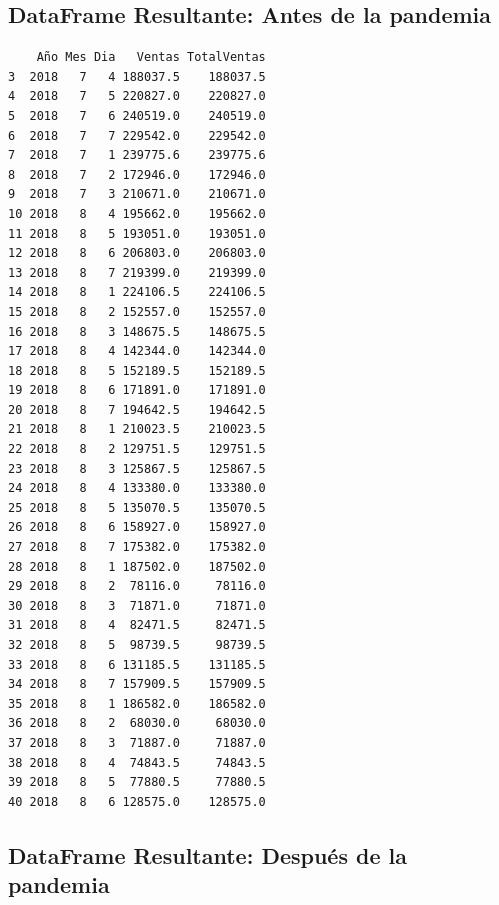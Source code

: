 \documentclass[
  us-letterpaper,
]{scrreprt}
\theoremstyle{definition}
\theoremstyle{plain}
\theoremstyle{plain}
\theoremstyle{remark}
\begin{document}
\subsection{DataFrame Resultante: Antes de la
pandemia}\label{dataframe-resultante-antes-de-la-pandemia}

\begin{verbatim}
    Año Mes Dia   Ventas TotalVentas
3  2018   7   4 188037.5    188037.5
4  2018   7   5 220827.0    220827.0
5  2018   7   6 240519.0    240519.0
6  2018   7   7 229542.0    229542.0
7  2018   7   1 239775.6    239775.6
8  2018   7   2 172946.0    172946.0
9  2018   7   3 210671.0    210671.0
10 2018   8   4 195662.0    195662.0
11 2018   8   5 193051.0    193051.0
12 2018   8   6 206803.0    206803.0
13 2018   8   7 219399.0    219399.0
14 2018   8   1 224106.5    224106.5
15 2018   8   2 152557.0    152557.0
16 2018   8   3 148675.5    148675.5
17 2018   8   4 142344.0    142344.0
18 2018   8   5 152189.5    152189.5
19 2018   8   6 171891.0    171891.0
20 2018   8   7 194642.5    194642.5
21 2018   8   1 210023.5    210023.5
22 2018   8   2 129751.5    129751.5
23 2018   8   3 125867.5    125867.5
24 2018   8   4 133380.0    133380.0
25 2018   8   5 135070.5    135070.5
26 2018   8   6 158927.0    158927.0
27 2018   8   7 175382.0    175382.0
28 2018   8   1 187502.0    187502.0
29 2018   8   2  78116.0     78116.0
30 2018   8   3  71871.0     71871.0
31 2018   8   4  82471.5     82471.5
32 2018   8   5  98739.5     98739.5
33 2018   8   6 131185.5    131185.5
34 2018   8   7 157909.5    157909.5
35 2018   8   1 186582.0    186582.0
36 2018   8   2  68030.0     68030.0
37 2018   8   3  71887.0     71887.0
38 2018   8   4  74843.5     74843.5
39 2018   8   5  77880.5     77880.5
40 2018   8   6 128575.0    128575.0
\end{verbatim}

\subsection{DataFrame Resultante: Después de la
pandemia}\label{dataframe-resultante-despuuxe9s-de-la-pandemia}
\end{document}
